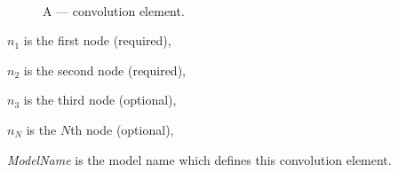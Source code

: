 \begin{figure}[h]
\centering
\ 
\caption{A --- convolution element.}
\end{figure}
\begin{widelist}
\item[$n_1$] is the first node (required),
\item[$n_2$] is the second node (required),
\item[$n_3$] is the third node (optional),
\item[$n_N$] is the $N$th node (optional),
\item[{\it ModelName}] is the model name which defines this convolution element.
\end{widelist}

